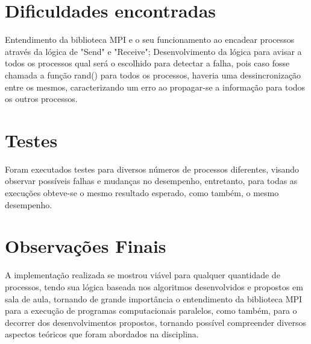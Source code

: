 \documentclass{article}
\begin{document}
\begin{multicols*}{2}
\section{Dificuldades encontradas}
Entendimento da biblioteca MPI e o seu funcionamento ao encadear processos através da lógica de "Send" e "Receive"; Desenvolvimento da lógica para avisar a todos os processos qual será o escolhido para detectar a falha, pois caso fosse chamada a função rand() para todos os processos, haveria uma dessincronização entre os mesmos, caracterizando um erro ao propagar-se a informação para todos os outros processos. \newline

\section{Testes}
Foram executados testes para diversos números de processos diferentes, visando observar possíveis falhas e mudanças no desempenho, entretanto, para todas as execuções obteve-se o mesmo resultado esperado, como também, o mesmo desempenho. \newline

\section{Observações Finais}
A implementação realizada se mostrou viável para qualquer quantidade de processos, tendo sua lógica baseada nos algoritmos desenvolvidos e propostos em sala de aula, tornando de grande importância o entendimento da biblioteca MPI para a execução de programas computacionais paralelos, como também, para o decorrer dos desenvolvimentos propostos, tornando possível compreender diversos aspectos teóricos que foram abordados na disciplina.

\end{multicols*}

\newpage



\newpage
\end{document}
